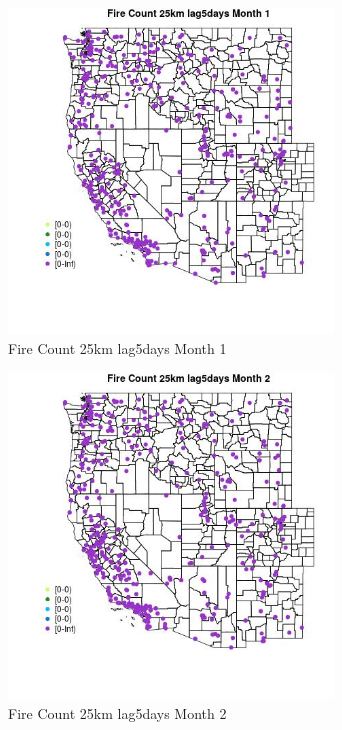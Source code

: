 \begin{figure} 
\centering  
\includegraphics[width=0.77\textwidth]{Code_Outputs/Report_ML_input_PM25_Step4_part_e_de_duplicated_aves_compiled_2019-05-18wNAs_MapObsMo1Fire_Count_25km_lag5days.jpg} 
\caption{\label{fig:Report_ML_input_PM25_Step4_part_e_de_duplicated_aves_compiled_2019-05-18wNAsMapObsMo1Fire_Count_25km_lag5days}Fire Count 25km lag5days Month 1} 
\end{figure} 
 

\clearpage 

\begin{figure} 
\centering  
\includegraphics[width=0.77\textwidth]{Code_Outputs/Report_ML_input_PM25_Step4_part_e_de_duplicated_aves_compiled_2019-05-18wNAs_MapObsMo2Fire_Count_25km_lag5days.jpg} 
\caption{\label{fig:Report_ML_input_PM25_Step4_part_e_de_duplicated_aves_compiled_2019-05-18wNAsMapObsMo2Fire_Count_25km_lag5days}Fire Count 25km lag5days Month 2} 
\end{figure} 
 

